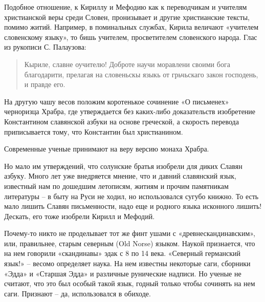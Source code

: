 Подобное отношение, к Кириллу и Мефодию как к переводчикам и учителям христианской веры среди Словен, пронизывает и другие христианские тексты, помимо житий. Например, в поминальных службах, Кирила величают «учителем словенскому языку», то бишь учителем, просветителем словенского народа. Глас из рукописи С. Палаузова:

\begin{quotation}
Кыриле, славне оучителю! Доброте научи моравлени своими бога благодарити, прелагая на словеньскы языкь от грьчьскаго закон господень, и правде его.
\end{quotation}

На другую чашу весов положим коротенькое сочинение «О письменех» черноризца Храбра, где утверждается без каких-либо доказательств изобретение Константином славянской азбуки на основе греческой, а скорость перевода приписывается тому, что Константин был христианином.

Современные ученые принимают на веру версию монаха Храбра.

Но мало им утверждений, что солунские братья изобрели для диких Славян азбуку. Много лет уже внедряется мнение, что и давний славянский язык, известный нам по дошедшим летописям, житиям и прочим памятникам литературы – в быту на Руси не ходил, но использовался сугубо книжно. То есть мало лишить Славян письменности, надо еще и родного языка исконного лишить! Дескать, его тоже изобрели Кирилл и Мефодий.



Почему-то никто не проделывает тот же финт ушами с «древнескандинавским», или, правильнее, старым северным (Old Norse) языком. Наукой признается, что на нем говорили «скандинавы» эдак с 8 по 14 века. «Северный германский язык!» – весомо определяет наука. На нем известны некоторые саги, сборники «Эдда» и «Старшая Эдда» и различные рунические надписи. Но ученые не считают, что это был особый такой язык, годный только чтобы сочинять на нем саги. Признают – да, использовался в обиходе.

